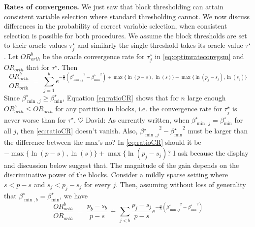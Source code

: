 \documentclass[aos]{imsart}
\theoremstyle{plain}
\newcommand{\david}[1]{{\small{\color{blue} \sf $\heartsuit$ David: #1}}}
\newcommand{\paul}[1]{{\small{\color{green} \sf $\spadesuit$ Paul: #1}}}
\begin{document}
\bigskip

\noindent\textbf{Rates of convergence.}   We just saw that block thresholding can attain consistent variable selection where standard thresholding cannot. We now discuss differences in the probability of correct variable selection, when consistent selection is possible for both procedures. We assume the block thresholds %
are set to their oracle values $\tau_j^\star$ %
and similarly the single threshold %
takes its oracle value $\tau^\star$.
Let ${OR}^b_{orth}$ be the oracle convergence rate for $\tau_j^\star$ %
in \eqref{eq:optimrateconvgsm} and ${OR}_{orth}$ that for $\tau^\star$. %
Then
\begin{equation}\label{eq:ratioCR}
    \frac{{OR}^b_{orth}}{{OR}_{orth}}\;=\;\sum_{j=1}^be^{-\frac{n}{8}\left({\beta^\star_{\min,j}}^2-{\beta_{\min}^\star}^2\right)+\max\{\ln(p-s),\ln(s)\}-\max\{\ln(p_j-s_j),\ln(s_j)\}}
\end{equation}
Since $\beta_{\min,j}^\star \geq \beta_{\min}^\star$, Equation \eqref{eq:ratioCR} shows that for $n$ large enough ${OR}^b_{orth} \leq {OR}_{orth}$ for any partition in blocks, i.e. the convergence rate for $\tau_j^\star$ is never worse than for $\tau^\star$. \david{As currently written, when $\beta_{\min,j}^\star = \beta_{\min}^\star$ for all $j$, then \eqref{eq:ratioCR} doesn't vanish. Also, ${\beta^\star_{\min,j}}^2-{\beta_{\min}^\star}^2$ must be larger than the difference between the max's no? In \eqref{eq:ratioCR} should it be $-\max\{\ln(p-s),\ln(s)\}+\max\{\ln(p_j-s_j)$? I ask because the display and discussion below suggest that.}
The magnitude of the gain depends on the discriminative power of the blocks. %
Consider a mildly sparse setting where $s<p-s$ and $s_j<p_j-s_j$ for every $j$. Then, assuming without loss of generality that $\beta_{\min,b}^\star=\beta_{\min}^\star$, we have
\begin{equation*}
    \frac{{OR}^b_{orth}}{{OR}_{orth}}\;=\; \frac{p_b-s_b}{p-s} \,+\,\sum_{j<b}\frac{p_j-s_j}{p-s}e^{-\frac{n}{8}\left({\beta^\star_{\min,j}}^2-{\beta_{\min}^\star}^2\right)}
\end{equation*}
\end{document}
